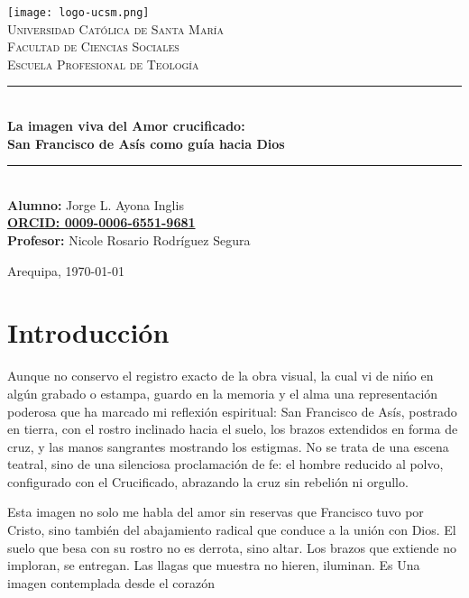 \documentclass[12pt]{article}
\begin{document}
\begin{titlepage}
	\begin{center}
		\texttt{[image: logo-ucsm.png]}\\[1cm]
		
		\textsc{\Large Universidad Católica de Santa María}\\[0.5cm]
		\textsc{Facultad de Ciencias Sociales}\\
		\textsc{Escuela Profesional de Teología}\\[2cm]
		
		\rule{\linewidth}{0.5mm} \\[0.4cm]
		{\huge \textbf{La imagen viva del Amor crucificado: \\[0.3cm] San Francisco de Asís como guía hacia Dios}}\\[0.4cm]
		\rule{\linewidth}{0.5mm} \\[1cm]
		
		\large{\textbf{Alumno:} Jorge L. Ayona Inglis\\
		\href{https://orcid.org/0009-0006-6551-9681}{\textbf{ORCID: 0009-0006-6551-9681}}\\[0cm]
		
		\textbf{Profesor:} Nicole Rosario Rodr\'iguez Segura\\[1cm]}
		
		Arequipa, \today %
	\end{center}
\end{titlepage}
\clearpage

	
	\section*{Introducción}
	
		Aunque no conservo el registro exacto de la obra visual, la cual vi de ni\'no en alg\'un grabado o estampa, guardo en la memoria y el alma una representación poderosa que ha marcado mi reflexión espiritual: San Francisco de Asís, postrado en tierra, con el rostro inclinado hacia el suelo, los brazos extendidos en forma de cruz, y las manos sangrantes mostrando los estigmas. No se trata de una escena teatral, sino de una silenciosa proclamación de fe: el hombre reducido al polvo, configurado con el Crucificado, abrazando la cruz sin rebelión ni orgullo.
	
	Esta imagen no solo me habla del amor sin reservas que Francisco tuvo por Cristo, sino también del abajamiento radical que conduce a la unión con Dios. El suelo que besa con su rostro no es derrota, sino altar. Los brazos que extiende no imploran, se entregan. Las llagas que muestra no hieren, iluminan. Es Una imagen contemplada desde el corazón
	
\end{document}
